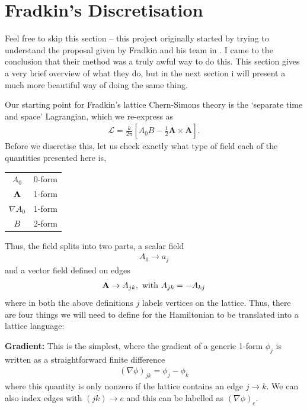 \documentclass[11pt, oneside]{article} %
\numberwithin{equation}{section}
\begin{document}
\section{Fradkin's Discretisation}
\begin{shaded}
    Feel free to skip this section -- this project originally started by trying to understand the proposal given by Fradkin and his team in \cite{sun_fradkin_2015}. I came to the conclusion that their method was a truly awful way to do this. This section gives a very brief overview of what they do, but in the next section i will present a much more beautiful way of doing the same thing.
\end{shaded}
Our starting point for Fradkin's lattice Chern-Simons theory is the `separate time and space' Lagrangian, which we re-express as 
\begin{align}
    \mathcal L = \frac{k}{2\pi}
    \left [  
    A_0  B -\frac 12 
    \textbf {A} \times \dot {\textbf {A}} 
    \right ].
\end{align}
Before we discretise this, let us check exactly what type of field each of the quantities presented here is,
\begin{center}
\begin{tabular}{|c|c|}
\hline
    $A_0$ & 0-form \\ 
    $\textbf A$ & 1-form \\ 
    $\nabla A_0$ & 1-form \\ 
    $B$ & 2-form \\ 
    \hline
\end{tabular}
\end{center}
Thus, the field splits into two parts, a scalar field 
\begin{align}
    A_0 \rightarrow a_j
\end{align}
and a vector field defined on edges
\begin{align}
    \textbf A \rightarrow A_{jk}, \textup{ with } A_{jk} = -A_{kj}
\end{align}
where in both the above definitions $j$ labels vertices on the lattice. Thus, there are four things we will need to define for the Hamiltonian to be translated into a lattice language:

\textbf{Gradient: } This is the simplest, where the gradient of a generic 1-form $\phi_j$ is written as a straightforward finite difference
\begin{align}
    (\nabla \phi)_{jk} = \phi_j - \phi_k
\end{align}
where this quantity is only nonzero if the lattice contains an edge $j \rightarrow k$. We can also index edges with $(jk)\rightarrow e$ and this can be labelled as $(\nabla \phi)_e$.
\end{document}
